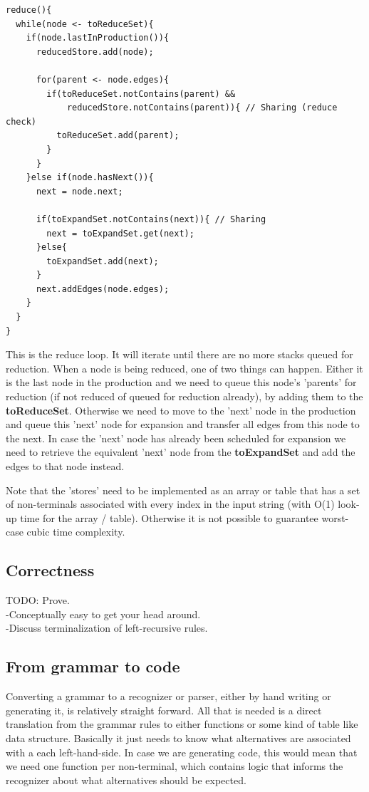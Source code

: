 \documentclass[a4paper,10pt]{article}
\begin{document}
{\small
\begin{verbatim}
reduce(){
  while(node <- toReduceSet){
    if(node.lastInProduction()){
      reducedStore.add(node);
      
      for(parent <- node.edges){
        if(toReduceSet.notContains(parent) &&
            reducedStore.notContains(parent)){ // Sharing (reduce check)
          toReduceSet.add(parent);
        }
      }
    }else if(node.hasNext()){
      next = node.next;
      
      if(toExpandSet.notContains(next)){ // Sharing
        next = toExpandSet.get(next);
      }else{
        toExpandSet.add(next);
      }
      next.addEdges(node.edges);
    }
  }
}
\end{verbatim}
}

This is the reduce loop. It will iterate until there are no more stacks queued for reduction. When a node is being reduced, one of two things can happen. Either it is the last node in the production and we need to queue this node's 'parents' for reduction (if not reduced of queued for reduction already), by adding them to the {\bf toReduceSet}. Otherwise we need to move to the 'next' node in the production and queue this 'next' node for expansion and transfer all edges from this node to the next. In case the 'next' node has already been scheduled for expansion we need to retrieve the equivalent 'next' node from the {\bf toExpandSet} and add the edges to that node instead.

Note that the 'stores' need to be implemented as an array or table that has a set of non-terminals associated with every index in the input string (with O(1) look-up time for the array / table). Otherwise it is not possible to guarantee worst-case cubic time complexity.

\subsection{Correctness}

TODO: Prove.\\
-Conceptually easy to get your head around.\\
-Discuss terminalization of left-recursive rules.

\subsection{From grammar to code}

Converting a grammar to a recognizer or parser, either by hand writing or generating it, is relatively straight forward. All that is needed is a direct translation from the grammar rules to either functions or some kind of table like data structure. Basically it just needs to know what alternatives are associated with a each left-hand-side. In case we are generating code, this would mean that we need one function per non-terminal, which contains logic that informs the recognizer about what alternatives should be expected.
\end{document}

